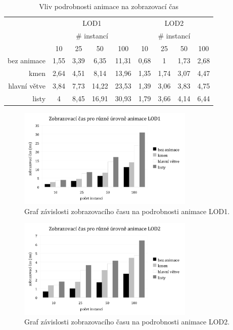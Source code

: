 %
\begin{table}[here]
\centering
\begin{tabular}{|r | c | c | c | c || c | c | c | c |} 
\hline 
		&\multicolumn{4}{|c||}{LOD1}		&\multicolumn{4}{c|}{LOD2}\\	
		&\multicolumn{4}{|c||}{\# instancí}	&\multicolumn{4}{c|}{\# instancí}\\
			&10		&25		&50		&100	&10		&25		&50		&100\\
\hline					
bez animace	&1,55	&3,39	&6,35	&11,31	&0,68	&1		&1,73	&2,68 \\
kmen		&2,64	&4,51	&8,14	&13,96	&1,35	&1,74	&3,07	&4,47\\
hlavní větve	&3,84	&7,73	&14,22	&23,53	&1,39	&3,06	&3,83	&4,75\\
listy			&4		&8,45	&16,91	&30,93	&1,79	&3,66	&4,14	&6,44\\
[1ex] 
\hline 
\end{tabular}
\label{table:lod12-anim}
\caption{Vliv podrobnosti animace na zobrazovací čas}
\end{table}

\begin{figure}[here]
\begin{center}
\includegraphics[width=0.75\textwidth]{./graphs/animLOD1.png}
\end{center}
\caption[Graf závislosti zobrazovacího času na podrobnosti animace LOD1]%
{Graf závislosti zobrazovacího času na podrobnosti animace LOD1.\label{fig:testANIM1}
}
\end{figure}
\begin{figure}[here]
\begin{center}
\includegraphics[width=0.75\textwidth]{./graphs/animLOD2.png}
\end{center}
\caption[Graf závislosti zobrazovacího času na podrobnosti animace LOD2]%
{Graf závislosti zobrazovacího času na podrobnosti animace LOD2.\label{fig:testANIM2}
}
\end{figure}


